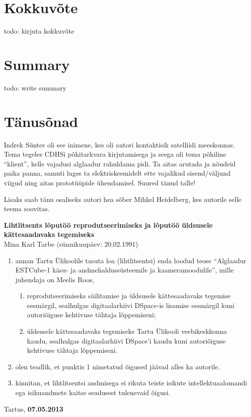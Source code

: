 \documentclass[12pt,a4paper]{article}
\begin{document}
\section{Kokkuvõte}
todo: kirjuta kokkuvõte
\section{Summary}
todo: write summary
\section{Tänusõnad}
Indrek Sünter oli see inimene, kes oli autori kontaktisik satelliidi meeskonnas.
Tema tegeles CDHSi põhitarkvara kirjutamisega ja seega oli tema põhiline
``klient'', kelle vajadusi alglaadur rahuldama pidi. Ta aitas arutada ja nõudeid
paika panna, samuti luges ta elektriskeemidelt ette vajalikud sisend/väljund
viigud ning aitas prototüüpide ühendamisel. Suured tänud talle!

Lisaks saab tänu osaliseks autori hea sõber Mihkel Heidelberg, kes autorile selle
teema soovitas.

\label{viited}



\pagebreak
\textbf{Lihtlitsents lõputöö reprodutseerimiseks ja lõputöö üldsusele
kättesaadavaks tegemiseks}\\

Mina Karl Tarbe (sünnikuupäev: 20.02.1991)
\begin{enumerate}
	\item
		annan Tartu Ülikoolile tasuta loa (lihtlitsentsi) enda loodud teose ``Alglaadur
		ESTCube-1 käsu- ja andmehaldussüsteemile ja kaameramoodulile'', mille juhendaja on
		Meelis Roos,
		\begin{enumerate}
			\item 
				reprodutseerimiseks säilitamise ja üldsusele kättesaadavaks
				tegemise eesmärgil, sealhulgas digitaalarhiivi DSpace-is
				lisamise eesmärgil kuni autoriõiguse kehtivuse tähtaja
				lõppemiseni;
			\item
				üldsusele kättesaadavaks tegemiseks Tartu Ülikooli
				veebikeskkonna kaudu, sealhulgas digitaalarhiivi DSpace'i kaudu
				kuni autoriõiguse kehtivuse tähtaja lõppemiseni.
		\end{enumerate}
	\item
		olen teadlik, et punktis 1 nimetatud õigused jäävad alles ka autorile.
	\item
		kinnitan, et lihtlitsentsi andmisega ei rikuta teiste isikute
		intellektuaalomandi ega isikuandmete kaitse seadusest tulenevaid õigusi.
\end{enumerate}

Tartus, \textbf{07.05.2013}
\end{document}

